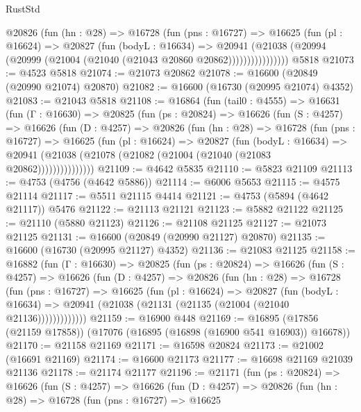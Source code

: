 \begin{lexlean}{RustStd}
\begin{coremodule}
{\begin{coremodule}
{{{{{{{{{{{{{{{{{{{{{{{{{{{{{{{{{{{{{{{{{{{{{{{{{{{{{{{              @20826
                (fun (hn : @28) =>
                @16728
                  (fun (pns : @16727) =>
                  @16625
                    (fun (pl : @16624) =>
                    @20827
                      (fun (bodyL : @16634) =>
                      @20941
                        (@21038
                          (@20994 (@20999 (@21004 (@21040 (@21043 @20860 @20862))))))))))))))))
    @5818
@21073 := @4523 @5818
@21074 := @21073 @20862
@21078 := @16600 (@20849 (@20990 @21074) @20870)
@21082 := @16600 (@16730 (@20995 @21074) @4352)
@21083 := @21043 @5818
@21108 := @16864
    (fun (tail0 : @4555) =>
    @16631
      (fun (Γ : @16630) =>
      @20825
        (fun (ps : @20824) =>
        @16626
          (fun (S : @4257) =>
          @16626
            (fun (D : @4257) =>
            @20826
              (fun (hn : @28) =>
              @16728
                (fun (pns : @16727) =>
                @16625
                  (fun (pl : @16624) =>
                  @20827
                    (fun (bodyL : @16634) =>
                    @20941 (@21038 (@21078 (@21082 (@21004 (@21040 (@21083 @20862)))))))))))))))
@21109 := @4642 @5835
@21110 := @5823 @21109
@21113 := @4753 (@4756 (@4642 @5886))
@21114 := @6006 @5653
@21115 := @4575 @21114
@21117 := @5511 @21115 @4414
@21121 := @4753 (@5894 (@4642 @21117)) @5476
@21122 := @21113 @21121
@21123 := @5882 @21122
@21125 := @21110 (@5880 @21123)
@21126 := @21108 @21125
@21127 := @21073 @21125
@21131 := @16600 (@20849 (@20990 @21127) @20870)
@21135 := @16600 (@16730 (@20995 @21127) @4352)
@21136 := @21083 @21125
@21158 := @16882
    (fun (Γ : @16630) =>
    @20825
      (fun (ps : @20824) =>
      @16626
        (fun (S : @4257) =>
        @16626
          (fun (D : @4257) =>
          @20826
            (fun (hn : @28) =>
            @16728
              (fun (pns : @16727) =>
              @16625
                (fun (pl : @16624) =>
                @20827
                  (fun (bodyL : @16634) =>
                  @20941 (@21038 (@21131 (@21135 (@21004 (@21040 @21136)))))))))))))
@21159 := @16900 @448
@21169 := @16895 (@17856 (@21159 @17858)) (@17076 (@16895 (@16898 (@16900 @541 @16903)) @16678))
@21170 := @21158 @21169
@21171 := @16598 @20824
@21173 := @21002 (@16691 @21169)
@21174 := @16600 @21173
@21177 := @16698 @21169 @21039 @21136
@21178 := @21174 @21177
@21196 := @21171
    (fun (ps : @20824) =>
    @16626
      (fun (S : @4257) =>
      @16626
        (fun (D : @4257) =>
        @20826
          (fun (hn : @28) =>
          @16728
            (fun (pns : @16727) =>
            @16625
}}}}}}}}}}}}}}}}}}}}}}}}}}}}}}}}}}}}}}}}}}}}}}}}}}}}}}}
\end{coremodule}}
\end{coremodule}
\end{lexlean}
